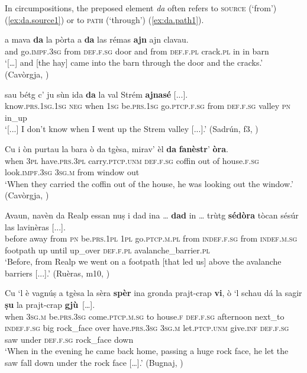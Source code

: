 In circumpositions, the preposed element \textit{da} often refers to \textsc{source} (`from') (\ref{ex:da.source1}) or to \textsc{path} (`through') (\ref{ex:da.path1}).

\ea
\label{ex:da.path1}
\gll […] a mava \textbf{da} la pòrta a \textbf{da} las rémas \textbf{ajn} ajn clavau.\\
{} and go.\textsc{impf.3sg} from \textsc{def.f.sg} door and from \textsc{def.f.pl} crack.\textsc{pl} in in barn \\
\glt `[…] and [the hay] came into the barn through the door and the cracks.' (Cavòrgja, \citealt[121]{Büchli1966})
\z

\ea
\label{ex:da.path2}
\gll  [...] sau bétg c’ ju sùn ida \textbf{da} la val Strém \textbf{ajnasé} [...].\\
{} know.\textsc{prs.1sg.1sg} \textsc{neg} when \textsc{1sg} be.\textsc{prs.1sg} go.\textsc{ptcp.f.sg} from \textsc{def.f.sg} valley \textsc{pn} in\_up\\
\glt `[...] I don’t know when I went up the Strem valley [...].' (Sadrún, f3, )
\z

\ea
\label{ex:da.source1}
\gll Cu i òn purtau la bara ò da tgèsa, mirav’ èl \textbf{da} \textbf{fanèstr}’ \textbf{òra}.\\
when \textsc{3pl} have.\textsc{prs.3pl} carry.\textsc{ptcp.unm} \textsc{def.f.sg} coffin out of house.\textsc{f.sg}
look.\textsc{impf.3sg} \textsc{3sg.m} from window out\\
\glt `When they carried the coffin out of the house, he was looking out the window.' (Cavòrgja, \citealt[123]{Büchli1966})
\z

\ea
\label{ex:dasedora1}
\gll  Avaun, navèn da Realp essan nuṣ i dad ina … \textbf{dad} in … trùtg \textbf{sédòra} tòcan sésúr las lavinèras [...]. \\
before away from \textsc{pn} be.\textsc{prs.1pl} \textsc{1pl} go.\textsc{ptcp.m.pl} from \textsc{indef.f.sg} {} from \textsc{indef.m.sg} {} footpath up until up\_over \textsc{def.f.pl} avalanche\_barrier.\textsc{pl} \\
\glt `Before, from Realp we went on a footpath [that led us] above the avalanche barriers [...].' (Ruèras, m10, )
\z

\ea
\label{ex:spervi1}
\gll Cu ‘l è vagnúṣ a tgèsa la sèra \textbf{spèr} ina gronda prajt-crap \textbf{vi}, ò `l schau dá la sagir \textbf{ṣu} la prajt-crap \textbf{gjù}~[…].\\
when \textsc{3sg.m} be.\textsc{prs.3sg} come.\textsc{ptcp.m.sg} to house.\textsc{f} \textsc{def.f.sg} afternoon next\_to \textsc{indef.f.sg} big rock\_face over have.\textsc{prs.3sg} \textsc{3sg.m} let.\textsc{ptcp.unm} give.\textsc{inf} \textsc{def.f.sg} saw under \textsc{def.f.sg} rock\_face down\\
\glt `When in the evening he came back home, passing a huge rock face, he let the saw fall down under the rock face […].' (Bugnaj, \citealt[135]{Büchli1966})
\z

